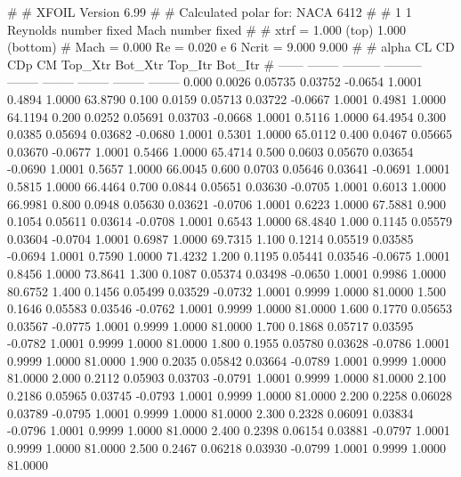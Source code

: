 #  
#       XFOIL         Version 6.99
#  
# Calculated polar for: NACA 6412                                       
#  
# 1 1 Reynolds number fixed          Mach number fixed         
#  
# xtrf =   1.000 (top)        1.000 (bottom)  
# Mach =   0.000     Re =     0.020 e 6     Ncrit =   9.000  9.000
#  
#   alpha    CL        CD       CDp       CM     Top_Xtr  Bot_Xtr  Top_Itr  Bot_Itr
#  ------ -------- --------- --------- -------- -------- -------- -------- --------
   0.000   0.0026   0.05735   0.03752  -0.0654   1.0001   0.4894   1.0000  63.8790
   0.100   0.0159   0.05713   0.03722  -0.0667   1.0001   0.4981   1.0000  64.1194
   0.200   0.0252   0.05691   0.03703  -0.0668   1.0001   0.5116   1.0000  64.4954
   0.300   0.0385   0.05694   0.03682  -0.0680   1.0001   0.5301   1.0000  65.0112
   0.400   0.0467   0.05665   0.03670  -0.0677   1.0001   0.5466   1.0000  65.4714
   0.500   0.0603   0.05670   0.03654  -0.0690   1.0001   0.5657   1.0000  66.0045
   0.600   0.0703   0.05646   0.03641  -0.0691   1.0001   0.5815   1.0000  66.4464
   0.700   0.0844   0.05651   0.03630  -0.0705   1.0001   0.6013   1.0000  66.9981
   0.800   0.0948   0.05630   0.03621  -0.0706   1.0001   0.6223   1.0000  67.5881
   0.900   0.1054   0.05611   0.03614  -0.0708   1.0001   0.6543   1.0000  68.4840
   1.000   0.1145   0.05579   0.03604  -0.0704   1.0001   0.6987   1.0000  69.7315
   1.100   0.1214   0.05519   0.03585  -0.0694   1.0001   0.7590   1.0000  71.4232
   1.200   0.1195   0.05441   0.03546  -0.0675   1.0001   0.8456   1.0000  73.8641
   1.300   0.1087   0.05374   0.03498  -0.0650   1.0001   0.9986   1.0000  80.6752
   1.400   0.1456   0.05499   0.03529  -0.0732   1.0001   0.9999   1.0000  81.0000
   1.500   0.1646   0.05583   0.03546  -0.0762   1.0001   0.9999   1.0000  81.0000
   1.600   0.1770   0.05653   0.03567  -0.0775   1.0001   0.9999   1.0000  81.0000
   1.700   0.1868   0.05717   0.03595  -0.0782   1.0001   0.9999   1.0000  81.0000
   1.800   0.1955   0.05780   0.03628  -0.0786   1.0001   0.9999   1.0000  81.0000
   1.900   0.2035   0.05842   0.03664  -0.0789   1.0001   0.9999   1.0000  81.0000
   2.000   0.2112   0.05903   0.03703  -0.0791   1.0001   0.9999   1.0000  81.0000
   2.100   0.2186   0.05965   0.03745  -0.0793   1.0001   0.9999   1.0000  81.0000
   2.200   0.2258   0.06028   0.03789  -0.0795   1.0001   0.9999   1.0000  81.0000
   2.300   0.2328   0.06091   0.03834  -0.0796   1.0001   0.9999   1.0000  81.0000
   2.400   0.2398   0.06154   0.03881  -0.0797   1.0001   0.9999   1.0000  81.0000
   2.500   0.2467   0.06218   0.03930  -0.0799   1.0001   0.9999   1.0000  81.0000
